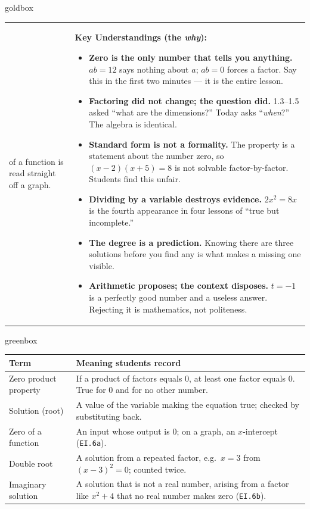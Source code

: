 \documentclass[10pt]{article}
\begin{document}
\begin{skillbox}{goldbox}
\begin{tabularx}{\linewidth}{@{}X|X@{}}
\begin{minipage}[t]{\linewidth}
of a function is read straight off a graph.
\end{minipage}
&
\begin{minipage}[t]{\linewidth}\vspace{0pt}
\textbf{Key Understandings (the \emph{why}):}
\begin{itemize}[leftmargin=1.1em, itemsep=2pt, topsep=2pt]
  \item \textbf{Zero is the only number that tells you anything.} $ab=12$ says nothing about $a$;
        $ab=0$ forces a factor. Say this in the first two minutes --- it is the entire lesson.
  \item \textbf{Factoring did not change; the question did.} 1.3--1.5 asked ``what are the
        dimensions?'' Today asks ``\emph{when}?'' The algebra is identical.
  \item \textbf{Standard form is not a formality.} The property is a statement about the number
        zero, so $(x-2)(x+5)=8$ is not solvable factor-by-factor. Students find this unfair.
  \item \textbf{Dividing by a variable destroys evidence.} $2x^2=8x$ is the fourth appearance in
        four lessons of ``true but incomplete.''
  \item \textbf{The degree is a prediction.} Knowing there are three solutions before you find any
        is what makes a missing one visible.
  \item \textbf{Arithmetic proposes; the context disposes.} $t=-1$ is a perfectly good number and a
        useless answer. Rejecting it is mathematics, not politeness.
\end{itemize}
\end{minipage}
\end{tabularx}
\end{skillbox}

\begin{skillbox}{greenbox}
\renewcommand{\arraystretch}{1.35}
\begin{tabularx}{\linewidth}{@{}p{3.6cm}X@{}}
\textbf{Term} & \textbf{Meaning students record} \\
\hline
Zero product property & If a product of factors equals $0$, at least one factor equals $0$. True
    for $0$ and for no other number. \\
Solution (root) & A value of the variable making the equation true; checked by substituting back. \\
Zero of a function & An input whose output is $0$; on a graph, an $x$-intercept (\texttt{EI.6a}). \\
Double root & A solution from a repeated factor, e.g.\ $x=3$ from $(x-3)^2=0$; counted twice. \\
Imaginary solution & A solution that is not a real number, arising from a factor like $x^2+4$ that
    no real number makes zero (\texttt{EI.6b}). \\
\end{tabularx}
\end{skillbox}
\end{document}
